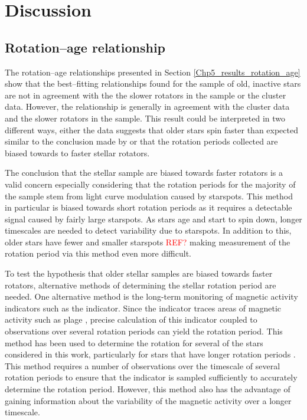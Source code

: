 \section{Discussion}

\subsection{Rotation--age relationship}
The rotation--age relationships presented in Section \ref{Chp5_results_rotation_age} show that the best--fitting relationships found for the sample of old, inactive stars are not in agreement with the the slower rotators in the sample or the cluster data. However, the \citet{Barnes_2007} relationship is generally in agreement with the cluster data and the slower rotators in the sample. This result could be interpreted in two different ways, either the data suggests that older stars spin faster than expected similar to the conclusion made by \citet{van_Saders_etal_2016} or that the rotation periods collected are biased towards to faster stellar rotators.

The conclusion that the stellar sample are biased towards faster rotators is a valid concern especially considering that the rotation periods for the majority of the sample stem from light curve modulation caused by starspots. This method in particular is biased towards short rotation periods as it requires a detectable signal caused by fairly large starspots. As stars age and start to spin down, longer timescales are needed to detect variability due to starspots. In addition to this, older stars have fewer and smaller starspots \textcolor{red}{REF?} making measurement of the rotation period via this method even more difficult.

To test the hypothesis that older stellar samples are biased towards faster rotators, alternative methods of determining the stellar rotation period are needed. One alternative method is the long-term monitoring of magnetic activity indicators such as the \Rprime indicator. Since the \Rprime indicator traces areas of magnetic activity such as plage \citep{Leighton_1959}, precise calculation of this indicator coupled to observations over several rotation periods can yield the rotation period. This method has been used to determine the rotation for several of the stars considered in this work, particularly for stars that have longer rotation periods \citep{Boro_Saikia_etal_2016,Vaughan_etal_1981,Robertson_etal_2015_GJ191}. This method requires a number of observations over the timescale of several rotation periods to ensure that the \Rprime indicator is sampled sufficiently to accurately determine the rotation period. However, this method also has the advantage of gaining information about the variability of the magnetic activity over a longer timescale.

